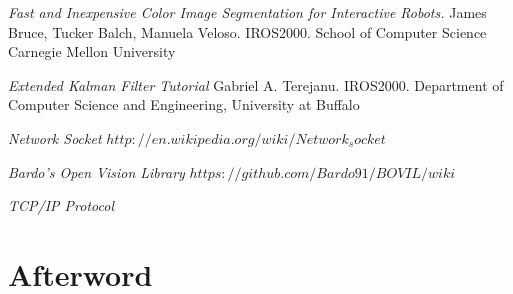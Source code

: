 \documentclass{book} %
\begin{document}
\begin{thebibliography}{9}
 \textit{Fast and Inexpensive Color Image Segmentation for Interactive Robots.} James Bruce, Tucker Balch, Manuela Veloso. IROS2000. School of Computer Science Carnegie Mellon University

 \textit{Extended Kalman Filter Tutorial} Gabriel A. Terejanu. IROS2000. Department of Computer Science and Engineering, University at Buffalo

 \textit{Network Socket} $http://en.wikipedia.org/wiki/Network_socket$

 \textit{Bardo's Open Vision Library} $https://github.com/Bardo91/BOVIL/wiki$

 \textit{TCP/IP Protocol} 

\end{thebibliography}

\backmatter

\chapter{Afterword}
\end{document}
